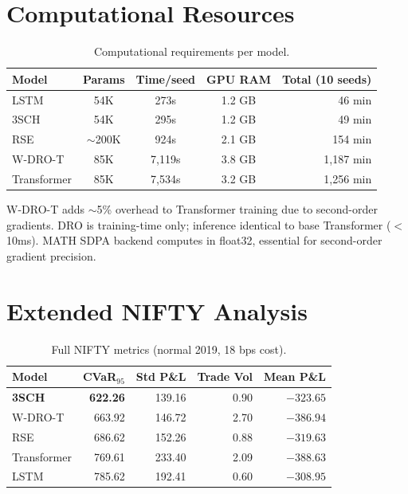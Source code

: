 \documentclass[11pt,oneside]{report}
\begin{document}
\chapter{Computational Resources}
\label{app:compute}

\begin{table}[H]
\centering\small
\caption{Computational requirements per model.}
\begin{tabular}{@{}lcccr@{}}
\toprule
\textbf{Model} & \textbf{Params} & \textbf{Time/seed} & \textbf{GPU RAM} & \textbf{Total (10 seeds)} \\\midrule
LSTM & 54K & 273s & 1.2 GB & 46 min \\
3SCH & 54K & 295s & 1.2 GB & 49 min \\
RSE & $\sim$200K & 924s & 2.1 GB & 154 min \\
W-DRO-T & 85K & 7,119s & 3.8 GB & 1,187 min \\
Transformer & 85K & 7,534s & 3.2 GB & 1,256 min \\
\bottomrule
\end{tabular}
\end{table}

W-DRO-T adds $\sim$5\% overhead to Transformer training due to second-order gradients. DRO is training-time only; inference identical to base Transformer ($<$10ms). MATH SDPA backend computes in float32, essential for second-order gradient precision.

\chapter{Extended NIFTY Analysis}
\label{app:nifty}

\begin{table}[H]
\centering\small
\caption{Full NIFTY metrics (normal 2019, 18 bps cost).}
\begin{tabular}{@{}lrrrr@{}}
\toprule
\textbf{Model} & \textbf{CVaR$_{95}$} & \textbf{Std P\&L} & \textbf{Trade Vol} & \textbf{Mean P\&L} \\\midrule
\textbf{3SCH} & \textbf{622.26} & 139.16 & 0.90 & $-323.65$ \\
W-DRO-T & 663.92 & 146.72 & 2.70 & $-386.94$ \\
RSE & 686.62 & 152.26 & 0.88 & $-319.63$ \\
Transformer & 769.61 & 233.40 & 2.09 & $-388.63$ \\
LSTM & 785.62 & 192.41 & 0.60 & $-308.95$ \\
\bottomrule
\end{tabular}
\end{table}
\end{document}
